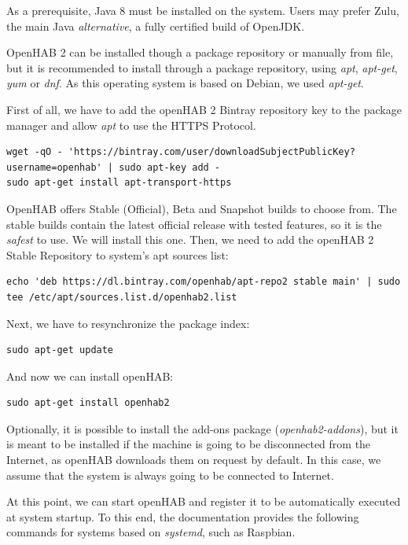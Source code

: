 As a prerequisite, Java 8 must be installed on the system. Users may prefer Zulu, the main Java \textit{alternative}, a fully
certified build of OpenJDK.\cite{zuluWebsite}

OpenHAB 2 can be installed though a package repository or manually from file, but it is recommended to install through a package
repository, using \textit{apt}, \textit{apt-get}, \textit{yum} or \textit{dnf}. As this operating system is based on Debian, we
used \textit{apt-get}.

First of all, we have to add the openHAB 2 Bintray repository key to the package manager and allow \textit{apt} to use the HTTPS
Protocol.

\begin{lstlisting}[style=Consola]
wget -qO - 'https://bintray.com/user/downloadSubjectPublicKey?username=openhab' | sudo apt-key add -
sudo apt-get install apt-transport-https
\end{lstlisting}

OpenHAB offers Stable (Official), Beta and Snapshot builds to choose from. The stable builds contain the latest official release
with tested features, so it is the \textit{safest} to use. We will install this one. Then, we need to add the openHAB 2 Stable Repository
to system's apt sources list:

\begin{lstlisting}[style=Consola]
echo 'deb https://dl.bintray.com/openhab/apt-repo2 stable main' | sudo tee /etc/apt/sources.list.d/openhab2.list
\end{lstlisting}

Next, we have to resynchronize the package index:

\begin{lstlisting}[style=Consola]
sudo apt-get update
\end{lstlisting}

And now we can install openHAB:

\begin{lstlisting}[style=Consola]
sudo apt-get install openhab2
\end{lstlisting}

Optionally, it is possible to install the add-ons package (\textit{openhab2-addons}), but it is meant to be installed if the machine
is going to be disconnected from the Internet, as openHAB downloads them on request by default. In this case, we assume that the
system is always going to be connected to Internet.

At this point, we can start openHAB and register it to be automatically executed at system startup. To this end, the documentation
provides the following commands for systems based on \textit{systemd}, such as Raspbian.

